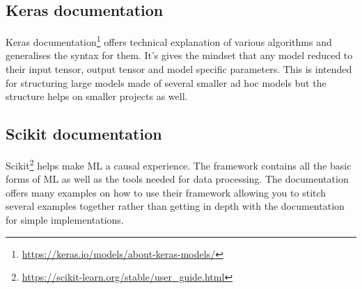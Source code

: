 \documentclass[../main.tex]{subfiles}
\begin{document}
\subsection{Keras documentation }
Keras documentation\footnote{\url{https://keras.io/models/about-keras-models/}} offers technical explanation of various algorithms and generalises the syntax for them. It's gives the mindset that any model reduced to their input tensor, output tensor and model specific parameters. This is intended for structuring large models made of several smaller ad hoc models but the structure helps on smaller projects as well.

\subsection{Scikit documentation }
Scikit\footnote{\url{https://scikit-learn.org/stable/user_guide.html}} helps make ML a causal experience. The framework contains all the basic forms of ML as well as the tools needed for data processing. The documentation offers many examples on how to use their framework allowing you to stitch several examples together rather than getting in depth with the documentation for simple implementations.
\end{document}
